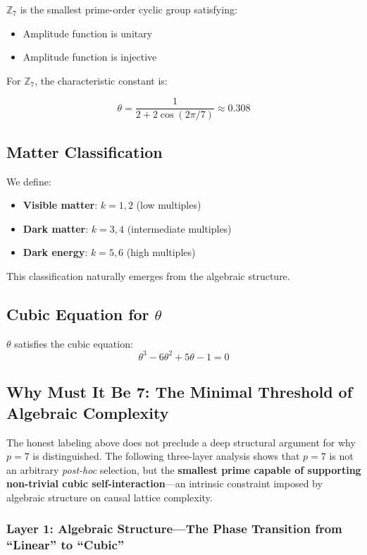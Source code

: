 \documentclass[aps,prd,twocolumn,nofootinbib,floatfix]{revtex4-2}
\begin{document}
$\mathbb{Z}_7$ is the smallest prime-order cyclic group satisfying:
\begin{itemize}
    \item Amplitude function is unitary
    \item Amplitude function is injective
\end{itemize}

For $\mathbb{Z}_7$, the characteristic constant is:

\[
\theta = \frac{1}{2 + 2\cos(2\pi/7)} \approx 0.308
\]

\subsection{Matter Classification}

We define:
\begin{itemize}
    \item \textbf{Visible matter}: $k = 1, 2$ (low multiples)
    \item \textbf{Dark matter}: $k = 3, 4$ (intermediate multiples)
    \item \textbf{Dark energy}: $k = 5, 6$ (high multiples)
\end{itemize}

This classification naturally emerges from the algebraic structure.

\subsection{Cubic Equation for $\theta$}

$\theta$ satisfies the cubic equation:
\[
\theta^3 - 6\theta^2 + 5\theta - 1 = 0
\]

\subsection{Why Must It Be 7: The Minimal Threshold of Algebraic Complexity}

The honest labeling above does not preclude a deep structural argument for why $p=7$ is distinguished. The following three-layer analysis shows that $p=7$ is not an arbitrary \textit{post-hoc} selection, but the \textbf{smallest prime capable of supporting non-trivial cubic self-interaction}---an intrinsic constraint imposed by algebraic structure on causal lattice complexity.

\subsubsection{Layer 1: Algebraic Structure---The Phase Transition from ``Linear'' to ``Cubic''}
\end{document}
